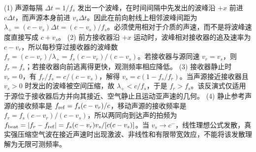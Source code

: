 (1) 声源每隔 \(\Delta t=1/f_s\) 发出一个波峰，在时间间隔中先发出的波峰沿 \(+x\) 前进 \(c\Delta t\)，而声源本身前进 \(v_s\Delta t\)。因此在前向射线上相邻波峰间距为 \(\lambda_+=(c-v_s)\Delta t=(c-v_s)/f_s\)。必须使用相对于介质的声速，而不是将波峰速度直接写成 \(c+v_s\)。
(2) 前方接收器沿 \(+x\) 运动时，波峰相对接收器的追及速率为 \(c-v_r\)，所以每秒穿过接收器的波峰数 \(f_r=(c-v_r)/\lambda_+=f_s(c-v_r)/(c-v_s)\)。若接收器与源同速 \(v_r=v_s\)，则 \(f_r=f_s\)；若接收器向前逃离得更快，观测频率相应降低。
(3) 接收器静止时 \(v_r=0\)，有 \(f_r/f_s=c/(c-v_s)\)，解得 \(v_s=c(1-f_s/f_r)\)。当声源接近接收器且 \(v_s>0\) 时发出的波峰被空间压缩，故 \(\lambda_+<c/f_s\)，于是 \(f_r>f_s\)。该反演式仅适用于源位于接收器后方并向其接近、空气静止且运动亚声速的几何。
(4) 静止参考声源的接收频率是 \(f_{\rm ref}=f_s(c-v_r)/c\)，移动声源的接收频率是 \(f_r=f_s(c-v_r)/(c-v_s)\)，所以两同向到达声的拍频为 \(f_{\rm beat}=|f_r-f_{\rm ref}|=f_s(c-v_r)v_s/[c(c-v_s)]\)。当 \(v_s\to c^-\)，线性理想公式发散，真实强压缩空气波在接近声速时出现激波、非线性和有限带宽效应，不能将该发散理解为无限可测频率。
